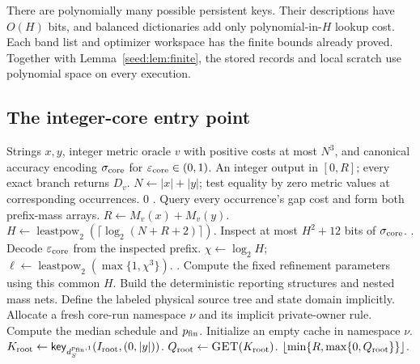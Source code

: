 \documentclass[11pt]{article}
\newcommand{\wedkey}[2]{\mathsf{key}_{#1}(#2)}
\newenvironment{wedalgorithm}[2]{%
  \begin{algorithm}[!htbp]%
  \caption{#1}\label{#2}%
  \small\begin{algorithmic}[1]%
}{%
  \end{algorithmic}\end{algorithm}%
}
\theoremstyle{definition}
\newcommand{\1}{\mathbf 1}
\begin{document}
There are polynomially many possible persistent keys.
Their descriptions have $O(H)$ bits, and balanced dictionaries add only
polynomial-in-$H$ lookup cost.
Each band list and optimizer workspace has the finite bounds already
proved. Together with Lemma~\ref{seed:lem:finite}, the stored records and
local scratch use polynomial space on every execution.

\subsection{The integer-core entry point}

\begin{wedalgorithm}{The bounded-integer entry point}{alg:integer-core}
\Require Strings $x,y$, integer metric oracle $v$ with positive costs at most $N^3$, and canonical accuracy encoding $\sigma_{\rm core}$ for $\varepsilon_{\rm core}\in(0,1)$.
\Ensure An integer output in $[0,R]$; every exact branch returns $D_v$.
  \State $N\gets|x|+|y|$; test equality by zero metric values at corresponding occurrences.
   \State \Return $0$ \EndIf
    \State \Return {}.
  \EndIf
  \State Query every occurrence's gap cost and form both prefix-mass arrays.
  \State $R\gets M_v(x)+M_v(y)$.
  \State $H\gets\operatorname{leastpow}_2(\lceil\log_2(N+R+2)\rceil)$.
  \State Inspect at most $H^2+12$ bits of $\sigma_{\rm core}$.
    \State \Return {}.
  \EndIf
  \State Decode $\varepsilon_{\rm core}$ from the inspected prefix.
  \State $\chi\gets\log_2H$; $\ell\gets\operatorname{leastpow}_2(\max\{1,\chi^3\})$.
    \State \Return {}.
  \EndIf
  \State Compute the fixed refinement parameters using this common $H$.
  \State Build the deterministic reporting structures and nested mass nets.
  \State Define the labeled physical source tree and state domain implicitly.
  \State Allocate a fresh core-run namespace $\nu$ and its implicit private-owner rule.
  \State Compute the median schedule and $p_{\rm fin}$.
  \State Initialize an empty cache in namespace $\nu$.
  \State $K_{\rm root}\gets\wedkey{d_S^{p_{\rm fin},1}}{I_{\rm root},(0,|y|)}$.
  \State $Q_{\rm root}\gets\Call{GET}{K_{\rm root}}$.
  \State \Return $\lfloor\min\{R,\max\{0,Q_{\rm root}\}\}\rfloor$.
\EndProcedure
\end{wedalgorithm}
\end{document}
